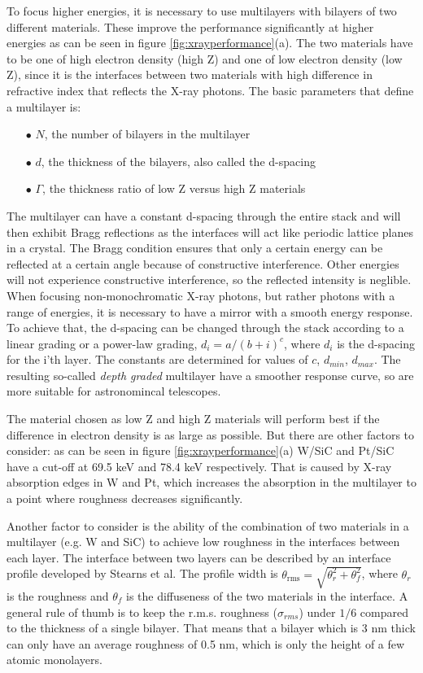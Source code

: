 To focus higher energies, it is necessary to use multilayers with bilayers of two different materials. These improve the performance significantly at higher energies as can be seen in figure \ref{fig:xrayperformance}(a). The two materials have to be one of high electron density (high Z) and one of low electron density (low Z), since it is the interfaces between two materials with high difference in refractive index that reflects the X-ray photons. The basic parameters that define a multilayer is:

\begin{itemize}
	\item[$\bullet$] $N$, the number of bilayers in the multilayer
	\item[$\bullet$] $d$, the thickness of the bilayers, also called the d-spacing
	\item[$\bullet$] $\Gamma$, the thickness ratio of low Z versus high Z materials
\end{itemize}

The multilayer can have a constant d-spacing through the entire stack and will then exhibit Bragg reflections as the interfaces will act like periodic lattice planes in a crystal. The Bragg condition ensures that only a certain energy can be reflected at a certain angle because of constructive interference. Other energies will not experience constructive interference, so the reflected intensity is neglible. When focusing non-monochromatic X-ray photons, but rather photons with a range of energies, it is necessary to have a mirror with a smooth energy response. To achieve that, the d-spacing can be changed through the stack according to a linear grading or a power-law grading\cite{Joensen:12je}, $d_i = a/(b+i)^c$, where $d_i$ is the d-spacing for the i'th layer. The constants are determined for values of $c$, $d_{min}$, $d_{max}$. The resulting so-called \emph{depth graded} multilayer have a smoother response curve, so are more suitable for astronomincal telescopes.

The material chosen as low Z and high Z materials will perform best if the difference in electron density is as large as possible. But there are other factors to consider: as can be seen in figure \ref{fig:xrayperformance}(a) W/SiC and Pt/SiC have a cut-off at 69.5 keV and 78.4 keV respectively. That is caused by X-ray absorption edges in W and Pt, which increases the absorption in the multilayer to a point where roughness decreases significantly.

Another factor to consider is the ability of the combination of two materials in a multilayer (e.g. W and SiC) to achieve low roughness in the interfaces between each layer. The interface between two layers can be described by an interface profile developed by Stearns et al\cite{Stearns:1989va}. The profile width is $\theta_{\text{rms}}=\sqrt{\theta_r^2 + \theta_f^2}$, where $\theta_r$ is the roughness and $\theta_f$ is the diffuseness of the two materials in the interface. A general rule of thumb is to keep the r.m.s. roughness ($\sigma_{rms}$) under $1/6$ compared to the thickness of a single bilayer. That means that a bilayer which is 3 nm thick can only have an average roughness of 0.5 nm, which is only the height of a few atomic monolayers.

